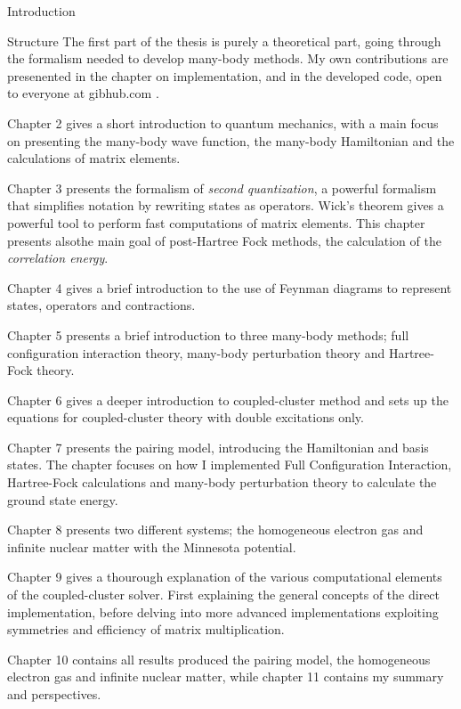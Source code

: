 \documentclass[twoside,english]{uiofysmaster}
\begin{document}
\begin{chapter}{Introduction}
	\begin{subsection}{Structure}
		The first part of the thesis is purely a theoretical part, going through the formalism needed to develop many-body methods. My own contributions are presenented in the chapter on implementation, and in the developed code, open to everyone at gibhub.com \cite{WholmenGithub}.

		Chapter 2 gives a short introduction to quantum mechanics, with a main focus on presenting the many-body wave function, the many-body Hamiltonian and the calculations of matrix elements. 

		Chapter 3 presents the formalism of \textit{second quantization}, a powerful formalism that simplifies notation by rewriting states as operators. Wick's theorem gives a powerful tool to perform fast computations of matrix elements. This chapter presents alsothe main goal of post-Hartree Fock methods, the calculation of the \textit{correlation energy}. 

		Chapter 4 gives a brief introduction to the use of Feynman diagrams to represent states, operators and contractions.

		Chapter 5 presents a brief introduction to three many-body methods; full configuration interaction theory, many-body perturbation theory and Hartree-Fock theory. 

		Chapter 6 gives a deeper introduction to coupled-cluster method and sets up the equations for coupled-cluster theory with double excitations only. 

		Chapter 7 presents the pairing model, introducing the Hamiltonian and basis states. The chapter focuses on how I implemented Full Configuration Interaction, Hartree-Fock calculations and many-body perturbation theory to calculate the ground state energy. 

		Chapter 8 presents two different systems; the homogeneous electron gas and infinite nuclear matter with the Minnesota potential. 

		Chapter 9 gives a thourough explanation of the various computational elements of the coupled-cluster solver. First explaining the general concepts of the direct implementation, before delving into more advanced implementations exploiting symmetries and efficiency of matrix multiplication. 

		Chapter 10 contains all results produced the pairing model, the homogeneous electron gas and infinite nuclear matter, while chapter 11 contains my summary and perspectives. 
	\end{subsection}
\end{chapter}
\end{document}
